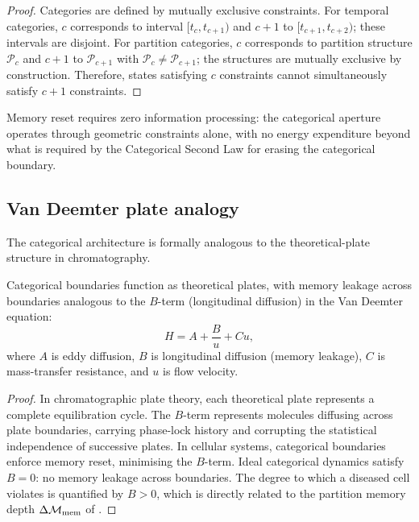 \begin{proof}
Categories are defined by mutually exclusive constraints.  For temporal
categories, $c$ corresponds to interval $[t_c, t_{c+1})$ and $c+1$ to
$[t_{c+1}, t_{c+2})$; these intervals are disjoint.  For partition
categories, $c$ corresponds to partition structure $\mathcal{P}_c$ and
$c+1$ to $\mathcal{P}_{c+1}$ with $\mathcal{P}_c \neq \mathcal{P}_{c+1}$;
the structures are mutually exclusive by construction.  Therefore, states
satisfying $c$ constraints cannot simultaneously satisfy $c+1$ constraints.
\end{proof}

\begin{corollary}
\label{cor:ch07-zero-overhead}
Memory reset requires zero information processing: the categorical aperture
operates through geometric constraints alone, with no energy expenditure
beyond what is required by the Categorical Second Law for erasing the
categorical boundary.
\end{corollary}

\subsection{Van Deemter plate analogy}

The categorical architecture is formally analogous to the theoretical-plate
structure in chromatography.

\begin{theorem}
\label{thm:ch07-van-deemter}
Categorical boundaries function as theoretical plates, with memory leakage
across boundaries analogous to the $B$-term (longitudinal diffusion) in the
Van Deemter equation:
\begin{equation}
  H = A + \frac{B}{u} + Cu,
  \label{eq:ch07-van-deemter}
\end{equation}
where $A$ is eddy diffusion, $B$ is longitudinal diffusion (memory leakage),
$C$ is mass-transfer resistance, and $u$ is flow velocity.
\end{theorem}

\begin{proof}
In chromatographic plate theory, each theoretical plate represents a complete
equilibration cycle.  The $B$-term represents molecules diffusing across plate
boundaries, carrying phase-lock history and corrupting the statistical
independence of successive plates.  In cellular systems, categorical
boundaries enforce memory reset, minimising the $B$-term.  Ideal categorical
dynamics satisfy $B = 0$: no memory leakage across boundaries.  The degree
to which a diseased cell violates  is quantified
by $B > 0$, which is directly related to the partition memory depth
$\Delta\mathcal{M}_{\mathrm{mem}}$ of .
\end{proof}


